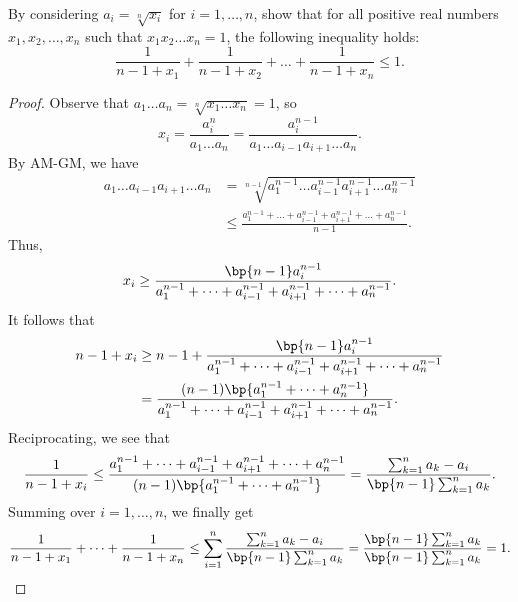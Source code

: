 \begin{problem}
    By considering $a_i = \sqrt[n]{x_i}$ for $i = 1, \dots, n$, show that for all positive real numbers $x_1, x_2, \dots, x_n$ such that $x_1 x_2 \dots x_n = 1$, the following inequality holds: \[\frac1{n-1 + x_1} + \frac1{n - 1 + x_2} + \dots + \frac1{n-1+x_n} \leq 1.\]
\end{problem}
\begin{proof}
    Observe that $a_1 \dots a_n = \sqrt[n]{x_1 \dots x_n} = 1$, so \[x_i = \frac{a_i^n}{a_1 \dots a_n} = \frac{a_i^{n-1}}{a_1 \dots a_{i-1}a_{i+1}\dots a_n}.\] By AM-GM, we have
    \begin{align*}
        a_1 \dots a_{i-1} a_{i+1} \dots a_n &= \sqrt[n-1]{a_1^{n-1} \dots a_{i-1}^{n-1} a_{i+1}^{n-1} \dots a_n^{n-1}}\\
        &\leq \frac{a_1^{n-1} + \dots + a_{i-1}^{n-1} + a_{i+1}^{n-1} + \dots + a_n^{n-1}}{n-1}.
    \end{align*}
    Thus, \[x_i \geq \frac{\bp{n-1}a_i^{n-1}}{a_1^{n-1} + \dots + a_{i-1}^{n-1} + a_{i+1}^{n-1} + \dots + a_n^{n-1}}.\] It follows that
    \begin{align*}
        n-1 + x_i &\geq n-1 + \frac{\bp{n-1}a_i^{n-1}}{a_1^{n-1} + \dots + a_{i-1}^{n-1} + a_{i+1}^{n-1} + \dots + a_n^{n-1}}\\
        &= \frac{(n-1)\bp{a_1^{n-1} + \dots + a_n^{n-1}}}{a_1^{n-1} + \dots + a_{i-1}^{n-1} + a_{i+1}^{n-1} + \dots + a_n^{n-1}}.
    \end{align*}
    Reciprocating, we see that \[\frac1{n-1+x_i} \leq \frac{a_1^{n-1} + \dots + a_{i-1}^{n-1} + a_{i+1}^{n-1} + \dots + a_n^{n-1}}{(n-1)\bp{a_1^{n-1} + \dots + a_n^{n-1}}} = \frac{\sum_{k = 1}^n a_k - a_i}{\bp{n-1}\sum_{k = 1}^n a_k}.\] Summing over $i = 1, \dots, n$, we finally get \[\frac1{n-1 + x_1} + \dots + \frac1{n-1+x_n} \leq \sum_{i = 1}^n \frac{\sum_{k = 1}^n a_k - a_i}{\bp{n-1}\sum_{k = 1}^n a_k} = \frac{\bp{n-1} \sum_{k = 1}^n a_k}{\bp{n-1}\sum_{k = 1}^n a_k} = 1.\]
\end{proof}

